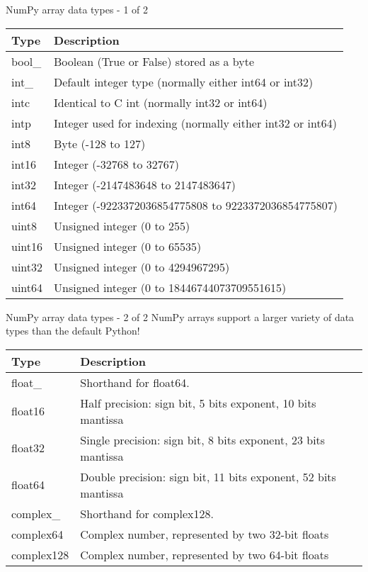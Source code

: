 \documentclass[10pt]{beamer}
\begin{document}
\begin{frame}{NumPy array data types - 1 of 2}
\begin{table}
\begin{tabular}{ll}
\textbf{Type} & \textbf{Description}  \\
\hline
bool\_ 	  &  Boolean (True or False) stored as a byte \\
int\_ 	    &  Default integer type (normally either int64 or int32) \\
intc 	    &  Identical to C int (normally int32 or int64) \\
intp 	    &  Integer used for indexing (normally either int32 or int64) \\
int8 	    &  Byte (-128 to 127) \\
int16 	  &  Integer (-32768 to 32767) \\
int32 	  &  Integer (-2147483648 to 2147483647) \\
int64 	  &  Integer (-9223372036854775808 to 9223372036854775807) \\
uint8 	  &  Unsigned integer (0 to 255) \\
uint16 	  &  Unsigned integer (0 to 65535) \\
uint32 	  &  Unsigned integer (0 to 4294967295) \\
uint64 	  &  Unsigned integer (0 to 18446744073709551615) \\
\end{tabular}
\end{table}
\end{frame}
\begin{frame}{NumPy array data types - 2 of 2}
NumPy arrays support a larger variety of data types than the default Python!
\begin{table}
\begin{tabular}{ll}
\textbf{Type} & \textbf{Description}  \\
\hline
float\_ 	  &  Shorthand for float64. \\
float16 	&  Half precision: sign bit, 5 bits exponent, 10 bits mantissa \\
float32 	&  Single precision: sign bit, 8 bits exponent, 23 bits mantissa \\
float64 	&  Double precision: sign bit, 11 bits exponent, 52 bits mantissa \\
complex\_ 	&  Shorthand for complex128. \\
complex64 &	Complex number, represented by two 32-bit floats  \\
complex128 & 	Complex number, represented by two 64-bit floats  \\
\end{tabular}
\end{table}
\end{frame}
\end{document}
